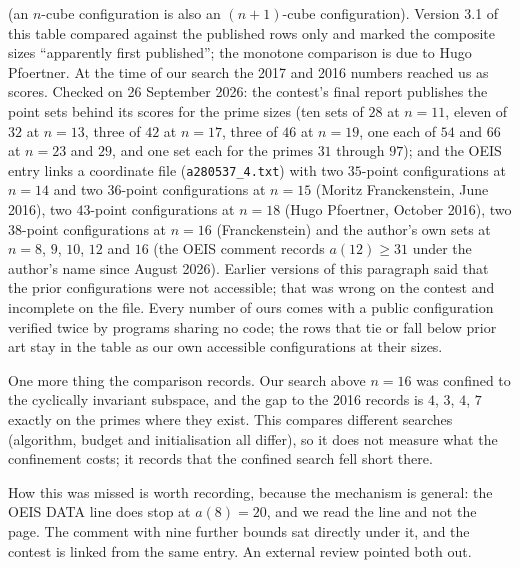 \documentclass[11pt,a4paper]{article}
\begin{document}
(an $n$-cube configuration is also an $(n+1)$-cube configuration).  Version 3.1 of this table
compared against the published rows only and marked the composite sizes ``apparently first
published''; the monotone comparison is due to Hugo Pfoertner.  At the time of our search the 2017 and 2016
numbers reached us as scores.  Checked on 26 September 2026: the contest's final report publishes the point
sets behind its scores for the prime sizes (ten sets of $28$ at $n=11$, eleven of $32$ at $n=13$, three of $42$ at
$n=17$, three of $46$ at $n=19$, one each of $54$ and $66$ at $n=23$ and $29$, and one set each for the primes
$31$ through $97$); and the OEIS entry links a coordinate file (\texttt{a280537\_4.txt}) with two $35$-point configurations
at $n=14$ and two $36$-point configurations at $n=15$ (Moritz Franckenstein, June 2016), two $43$-point
configurations at $n=18$ (Hugo Pfoertner, October 2016), two $38$-point configurations at $n=16$ (Franckenstein)
and the author's own sets at $n=8$, $9$, $10$, $12$ and $16$ (the OEIS comment records $a(12)\ge31$ under the
author's name since August 2026).  Earlier versions of this paragraph said that the prior configurations were
not accessible; that was wrong on the contest and incomplete on the file.  Every number of ours comes with a
public configuration verified twice by programs sharing no code; the rows that tie or fall below prior art stay
in the table as our own accessible configurations at their sizes.

One more thing the comparison records.  Our search above $n=16$ was confined to the cyclically
invariant subspace, and the gap to the 2016 records is $4$, $3$, $4$, $7$ exactly on the primes where
they exist.  This compares different searches (algorithm, budget and initialisation all differ), so it
does not measure what the confinement costs; it records that the confined search fell short there.

How this was missed is worth recording, because the mechanism is general: the OEIS DATA line
does stop at $a(8)=20$, and we read the line and not the page.  The comment with nine further
bounds sat directly under it, and the contest is linked from the same entry.  An external
review pointed both out.
\end{document}
